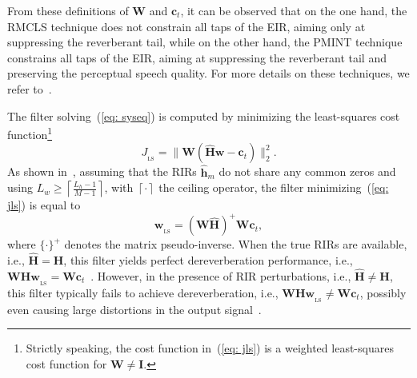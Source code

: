 \documentclass[fleqn]{aes2e}
\begin{document}
From these definitions of $\mathbf{W}$ and $\mathbf{c}_t$, it can be observed that on the one hand, the RMCLS technique does not constrain all taps of the EIR, aiming only at suppressing the reverberant tail, while on the other hand, the PMINT technique constrains all taps of the EIR, aiming at suppressing the reverberant tail and preserving the perceptual speech quality.
For more details on these techniques, we refer to~\cite{Lim_ITASLP_2014,Kodrasi_ITASLP_2013}.

The filter solving~(\ref{eq: syseq}) is computed by minimizing the least-squares cost function\footnote{Strictly speaking, the cost function in~(\ref{eq: jls}) is a weighted least-squares cost function for $\mathbf{W} \neq \mathbf{I}$.} 
\begin{equation}
\label{eq: jls}
J_{_{\text{LS}}} = \|\mathbf{W} (\hat{\mathbf{H}}\mathbf{w} - \mathbf{c}_t) \|_2^2.
\end{equation} 
As shown in~\cite{Miyoshi_ITASS_1988,Kodrasi_ITASLP_2013}, assuming that the RIRs $\hat{\mathbf{h}}_m$ do not share any common zeros and using $L_w \geq \left\lceil{\frac{L_h-1}{M-1}}\right\rceil$, with $\left\lceil{\cdot}\right\rceil$ the ceiling operator, the filter minimizing~(\ref{eq: jls}) is equal to
\begin{equation}
\label{eq: w_ls}
\mathbf{w}_{_{\text{LS}}} = (\mathbf{W}\hat{\mathbf{H}})^+\mathbf{W}\mathbf{c}_t,
\end{equation}
where $\{ \cdot \}^+$ denotes the matrix pseudo-inverse. 
When the true RIRs are available, i.e., $\hat{\mathbf{H}} = \mathbf{H}$, this filter yields perfect dereverberation performance, i.e., $\mathbf{W}\mathbf{H}\mathbf{w}_{_{\text{LS}}} = \mathbf{W}\mathbf{c}_t$~\cite{Kodrasi_ITASLP_2013}.
However, in the presence of RIR perturbations, i.e., $\hat{\mathbf{H}} \neq \mathbf{H}$, this filter typically fails to achieve dereverberation, i.e., $\mathbf{W}\mathbf{H}\mathbf{w}_{_{\text{LS}}} \neq \mathbf{W}\mathbf{c}_t$, possibly even causing large distortions in the output signal~\cite{Kodrasi_ITASLP_2013}.
\end{document}
